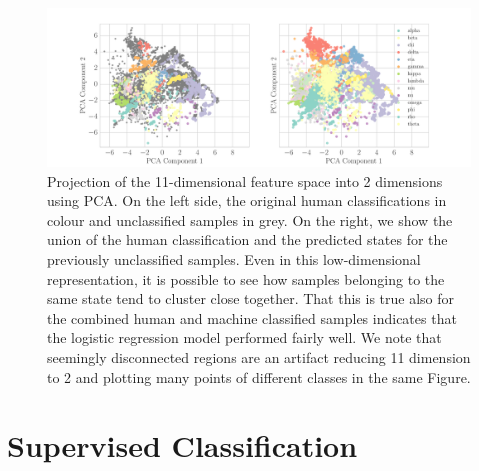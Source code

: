 \documentclass[12pt]{emulateapj}
\begin{document}
%
%

\begin{figure}[htbp]
\begin{center}
\includegraphics[width=\textwidth]{grs1915_supervised_pca_comparison.pdf}
\caption{Projection of the 11-dimensional feature space into 2 dimensions using PCA. On the left side, the original human classifications in colour and 
unclassified samples in grey. On the right, we show the union of the human classification and the predicted states for the previously unclassified samples. 
Even in this low-dimensional representation, it is possible to see how samples belonging to the same state tend to cluster close together. That this is true also 
for the combined human and machine classified samples indicates that the logistic regression model performed fairly well. We note that seemingly disconnected regions are an artifact reducing 11 dimension to 2 and plotting many points of different classes in the same Figure.} 
\label{fig:supervised_pca}
\end{center}
\end{figure}

\section{Supervised Classification}
\label{sec:supervised}
\end{document}
